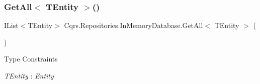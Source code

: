 \subsubsection{\texorpdfstring{Get\+All$<$ T\+Entity $>$()}{GetAll< TEntity >()}}
{\footnotesize\ttfamily I\+List$<$T\+Entity$>$ Cqrs.\+Repositories.\+In\+Memory\+Database.\+Get\+All$<$ T\+Entity $>$ (\begin{DoxyParamCaption}{ }\end{DoxyParamCaption})}

\begin{Desc}
\item[Type Constraints]\begin{description}
\item[{\em T\+Entity} : {\em Entity}]\end{description}
\end{Desc}
